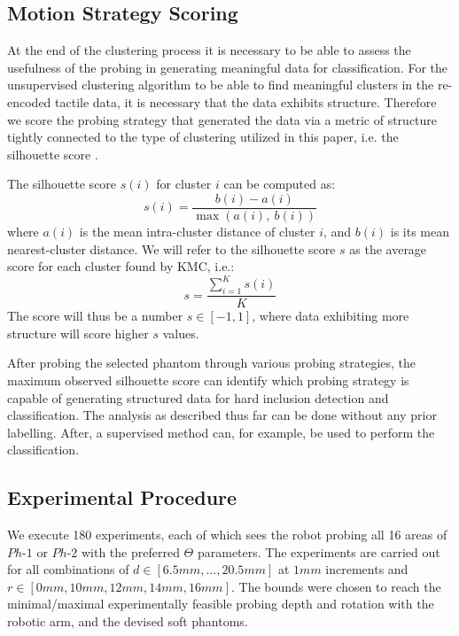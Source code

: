 \subsection{Motion Strategy Scoring} \label{sec_sil_coeff}
At the end of the clustering process it is necessary to be able to assess the usefulness of the probing in generating meaningful data for classification. For the unsupervised clustering algorithm to be able to find meaningful clusters in the re-encoded tactile data, it is necessary that the data exhibits structure. Therefore we score the probing strategy that generated the data via a metric of structure tightly connected to the type of clustering utilized in this paper, i.e. the silhouette score \cite{rousseeuw1987silhouettes}. 

The silhouette score $s(i)$ for cluster $i$ can be computed as:
\begin{equation}
s(i) = \frac{b(i)-a(i)}{\operatorname{max} (a(i),\ b(i))}
\end{equation}
where $a(i)$ is the mean intra-cluster distance of cluster $i$, and $b(i)$ is its mean nearest-cluster distance. 
We will refer to the silhouette score $s$ as the average score for each cluster found by KMC, i.e.: 
\begin{equation}
s = \frac{\sum_{i=1}^{K} s(i)}{K}
\end{equation}
The score will thus be a number $s \in [-1,1]$, where data exhibiting more structure will score higher $s$ values. 

After probing the selected phantom through various probing strategies, the maximum observed silhouette score can identify which probing strategy is capable of generating structured data for hard inclusion detection and classification. The analysis as described thus far can be done without any prior labelling. After, a supervised method can, for example, be used to perform the classification. 



\subsection{Experimental Procedure} \label{sec_overall_approach}
We execute 180 experiments, each of which sees the robot probing all 16 areas of $Ph\text{-}1$ or $Ph\text{-}2$ with the 
preferred $\Theta$ parameters. The experiments are carried out for all combinations of $d\in[6.5mm, ... , 20.5mm]$ at $1mm$
increments and $r\in[0mm, 10mm, 12mm, 14mm, 16mm]$. The bounds were chosen to reach the minimal/maximal experimentally 
feasible probing depth and rotation with the robotic arm, and the devised soft phantoms. 


